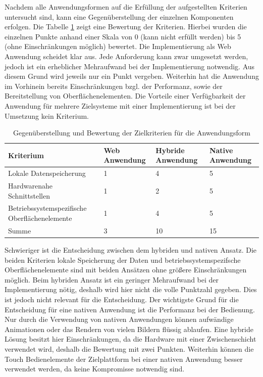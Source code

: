 Nachdem alle Anwendungsformen auf die Erfüllung der aufgestellten Kriterien untersucht sind, kann eine Gegenüberstellung der einzelnen Komponenten erfolgen. Die Tabelle \ref{decision} zeigt eine Bewertung der Kriterien. Hierbei wurden die einzelnen Punkte anhand einer Skala von 0 (kann nicht erfüllt werden) bis 5 (ohne Einschränkungen möglich) bewertet.  Die Implementierung als Web Anwendung scheidet klar aus. Jede Anforderung kann zwar umgesetzt werden, jedoch ist ein erheblicher Mehraufwand bei der Implementierung notwendig. Aus diesem Grund wird jeweils nur ein Punkt vergeben. Weiterhin hat die Anwendung im Vorhinein bereits Einschränkungen bzgl. der Performanz, sowie der Bereitstellung von Oberflächenelementen. Die Vorteile einer Verfügbarkeit der Anwendung für mehrere Zielsysteme mit einer Implementierung ist bei der Umsetzung kein Kriterium. \par
\begin{table}
\begin{tabular}{| p{5.4cm} | p{2.5cm} | p{2.5cm} | p{2.5cm} |}
\toprule[2pt] \rowcolor{dunkelgrau}
\hline
  Kriterium & Web \newline Anwendung & Hybride \newline Anwendung & Native \newline Anwendung \\
  \hline
  Lokale Datenspeicherung & 1 & 4 & 5
   \\
  \hline
  Hardwarenahe Schnittstellen &1  &2  & 5  \\
  \hline
    Betriebssystemspezifische Oberflächenelemente & 1 & 4 & 5 \\
  \hline
    Summe & 3 & 10 & 15 \\
  \hline
\bottomrule[2pt]
\end{tabular}
\caption{Gegenüberstellung und Bewertung der Zielkriterien für die Anwendungsform}
\label{decision}
\end{table}
\par 
Schwieriger ist die Entscheidung zwischen dem hybriden und nativen Ansatz. Die beiden Kriterien lokale Speicherung der Daten und betriebssystemspezifsche Oberflächenelemente sind mit beiden Ansätzen ohne größere Einschränkungen möglich. Beim hybriden Ansatz ist ein geringer Mehraufwand bei der Implementierung nötig, deshalb wird hier nicht die volle Punktzahl gegeben. Dies ist jedoch nicht relevant für die Entscheidung. Der wichtigste Grund für die Entscheidung für eine nativen Anwendung ist die Performanz bei der Bedienung. Nur durch die Verwendung von nativen Anwendungen können aufwändige Animationen oder das Rendern von vielen Bildern flüssig ablaufen. Eine hybride Lösung besitzt hier Einschränkungen, da die Hardware mit einer Zwischenschicht verwendet wird, deshalb die Bewertung mit zwei Punkten. Weiterhin können die Touch Bedienelemente der Zielplattform bei einer nativen Anwendung besser verwendet werden, da keine Kompromisse notwendig sind.

